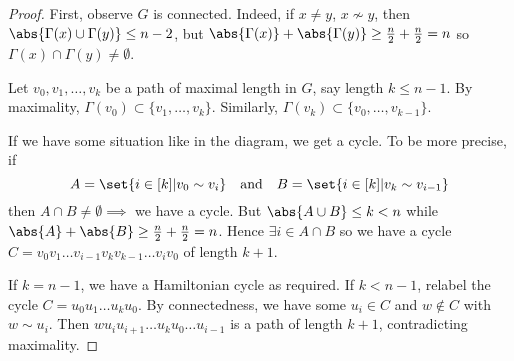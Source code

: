 \documentclass{article}
\begin{document}
\begin{proof}
    First, observe $G$ is connected.
    Indeed, if $x \neq y$, $x \nsim y$, then $\abs{\Gamma(x) \cup \Gamma(y)} \leq n-2$, but $\abs{\Gamma(x)} + \abs{\Gamma(y)} \geq \frac{n}{2} + \frac{n}{2} = n$ so $\Gamma(x) \cap \Gamma(y) \neq \emptyset$.

    Let $v_0, v_1, \dotsc, v_k$ be a path of maximal length in $G$, say length $k \leq n-1$.
    By maximality, $\Gamma(v_0) \subset \{v_1, \dotsc, v_k\}$. Similarly, $\Gamma(v_k) \subset \{v_0, \dotsc, v_{k-1}\}$.
    \begin{center}
    \end{center}

    If we have some situation like in the diagram, we get a cycle. To be more precise, if
    \begin{equation*}
        A = \set{i \in [k] | v_0 \sim v_i} \quad \text{and} \quad B = \set{i \in [k] | v_k \sim v_{i-1}}
    \end{equation*}
    then $A \cap B \neq \emptyset \implies$ we have a cycle.
    But $\abs{A \cup B} \leq k < n$ while $\abs{A} + \abs{B} \geq \frac{n}{2} + \frac{n}{2} = n$.
    Hence $\exists i \in A \cap B$ so we have a cycle $C = v_0 v_1 \dotsc v_{i-1} v_k v_{k-1} \dotsc v_i v_0$ of length $k+1$.

    If $k = n-1$, we have a Hamiltonian cycle as required.
    If $k < n-1$, relabel the cycle $C = u_0 u_1 \dotsc u_k u_0$.
    By connectedness, we have some $u_i \in C$ and $w \notin C$ with $w \sim u_i$.
    Then $w u_i u_{i+1} \dotsc u_k u_0 \dotsc u_{i-1}$ is a path of length $k+1$, contradicting maximality.
\end{proof}
\end{document}
